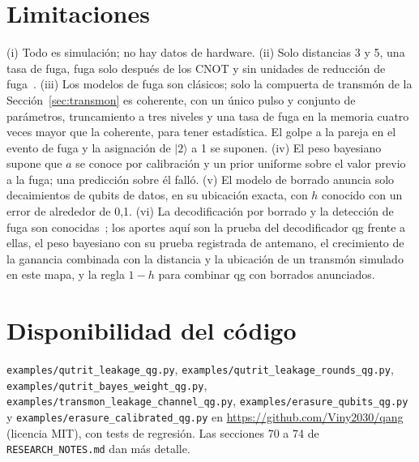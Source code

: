 \documentclass[11pt]{article}
\begin{document}
\section{Limitaciones}

(i) Todo es simulación; no hay datos de hardware. (ii) Solo distancias 3 y 5, una tasa de fuga, fuga
solo después de los CNOT y sin unidades de reducción de fuga~\cite{mcewen2021leakage}. (iii) Los
modelos de fuga son clásicos; solo la compuerta de transmón de la Sección~\ref{sec:transmon} es
coherente, con un único pulso y conjunto de parámetros, truncamiento a tres niveles y una tasa de fuga
en la memoria cuatro veces mayor que la coherente, para tener estadística. El golpe a la pareja en el
evento de fuga y la asignación de $|2\rangle$ a 1 se suponen. (iv) El peso bayesiano supone que $a$ se
conoce por calibración y un prior uniforme sobre el valor previo a la fuga; una predicción sobre él
falló. (v) El modelo de borrado anuncia solo decaimientos de qubits de datos, en su ubicación exacta,
con $h$ conocido con un error de alrededor de 0{,}1. (vi) La decodificación por borrado y la detección de fuga son
conocidas~\cite{suchara2015leakage,wu2022erasure,varbanov2020leakage}; los aportes aquí son la prueba
del decodificador qg frente a ellas, el peso bayesiano con su prueba registrada de antemano, el
crecimiento de la ganancia combinada con la distancia y la ubicación de un transmón simulado en este
mapa, y la regla $1-h$ para combinar qg con borrados anunciados.

\section{Disponibilidad del código}
\sloppy
\texttt{examples/qutrit\_leakage\_qg.py}, \texttt{examples/qutrit\_leakage\_rounds\_qg.py},
\texttt{examples/qutrit\_bayes\_weight\_qg.py}, \texttt{examples/transmon\_leakage\_channel\_qg.py},
\texttt{examples/erasure\_qubits\_qg.py} y \texttt{examples/erasure\_calibrated\_qg.py}
en \url{https://github.com/Viny2030/qang} (licencia MIT), con tests de regresión. Las secciones 70 a 74
de \texttt{RESEARCH\_NOTES.md} dan más detalle.



\end{document}
